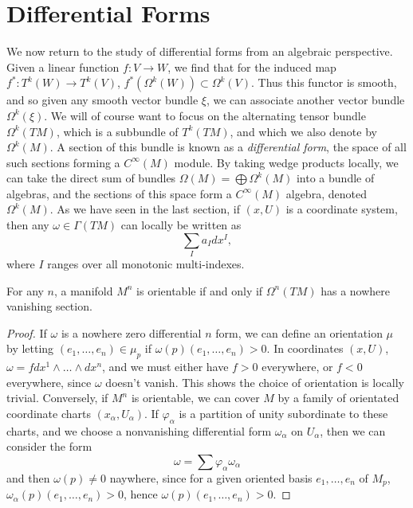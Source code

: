 \section{Differential Forms}

We now return to the study of differential forms from an algebraic perspective. Given a linear function $f: V \to W$, we find that for the induced map $f^*: T^k(W) \to T^k(V)$, $f^*(\Omega^k(W)) \subset \Omega^k(V)$. Thus this functor is smooth, and so given any smooth vector bundle $\xi$, we can associate another vector bundle $\Omega^k(\xi)$. We will of course want to focus on the alternating tensor bundle $\Omega^k(TM)$, which is a subbundle of $T^k(TM)$, and which we also denote by $\Omega^k(M)$. A section of this bundle is known as a \emph{differential form}, the space of all such sections forming a $C^\infty(M)$ module. By taking wedge products locally, we can take the direct sum of bundles $\Omega(M) = \bigoplus \Omega^k(M)$ into a bundle of algebras, and the sections of this space form a $C^\infty(M)$ algebra, denoted $\Omega^k(M)$. As we have seen in the last section, if $(x,U)$ is a coordinate system, then any $\omega \in \Gamma(TM)$ can locally be written as
%
\[ \sum_I a_I dx^I, \]
%
where $I$ ranges over all monotonic multi-indexes.

\begin{theorem}
    For any $n$, a manifold $M^n$ is orientable if and only if $\Omega^n(TM)$ has a nowhere vanishing section.
\end{theorem}
\begin{proof}
    If $\omega$ is a nowhere zero differential $n$ form, we can define an orientation $\mu$ by letting $(e_1, \dots, e_n) \in \mu_p$ if $\omega(p)(e_1, \dots, e_n) > 0$. In coordinates $(x,U)$, $\omega = f dx^1 \wedge \dots \wedge dx^n$, and we must either have $f > 0$ everywhere, or $f < 0$ everywhere, since $\omega$ doesn't vanish. This shows the choice of orientation is locally trivial. Conversely, if $M^n$ is orientable, we can cover $M$ by a family of orientated coordinate charts $(x_\alpha, U_\alpha)$. If $\varphi_\alpha$ is a partition of unity subordinate to these charts, and we choose a nonvanishing differential form $\omega_\alpha$ on $U_\alpha$, then we can consider the form
    \[ \omega = \sum \varphi_\alpha \omega_\alpha \]
    and then $\omega(p) \neq 0$ naywhere, since for a given oriented basis $e_1, \dots, e_n$ of $M_p$, $\omega_\alpha(p)(e_1, \dots, e_n) > 0$, hence $\omega(p)(e_1, \dots, e_n) > 0$.
\end{proof}

